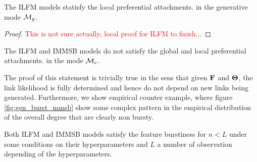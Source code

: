 \begin{proposition}
	The ILFM models statisfy the local preferential attachments. in the generative mode $\mathcal{M}_g$.
\end{proposition}
\begin{proof}
	\textcolor{red}{This is not sure actually, local proof for ILFM to finish...}
\end{proof}

\begin{proposition}
	The ILFM and IMMSB models do not satisfy the global and local preferential attachments. in the mode $\mathcal{M}_e$.
\end{proposition}

The proof of this statement is trivially true in the sens that given $\mathbf{F}$ and $\mathbf{\Theta}$, the link likelihood is fully determined and hence do not depend on new links being generated. Furthermore, we show empirical counter example, where figure \ref{fig:gen_burst_mmsb} show some complex pattern in the empirical distribution of the overall degree that are clearly non bursty.

\begin{proposition} \label{prop:diaconis}
	Both ILFM and IMMSB models satisfy the feature burstiness for $n < L$ under some conditions on their hyperparameters  and $L$ a number of observation depending of the hyperparameters.
\end{proposition}

